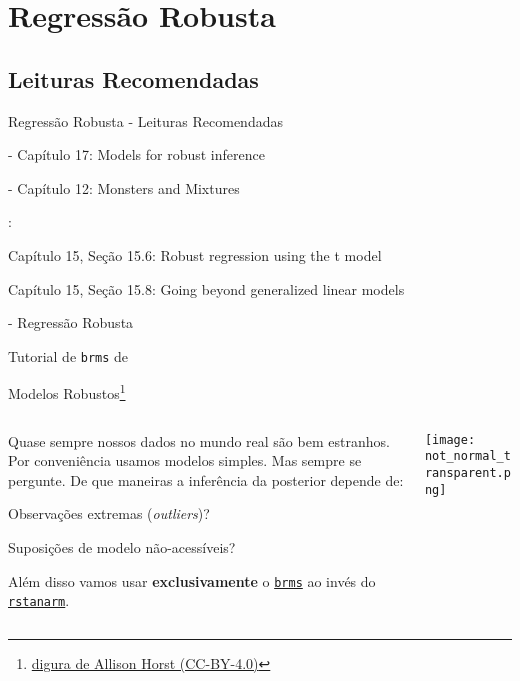 \section{Regressão Robusta}

\subsection{Leituras Recomendadas}
\begin{frame}{Regressão Robusta - Leituras Recomendadas}
    \begin{vfilleditems}
        \item \textcite{gelman2013bayesian} - Capítulo 17: Models for robust inference
        \item \textcite{mcelreath2020statistical} - Capítulo 12: Monsters and Mixtures
        \item \textcite{gelman2020regression}:
        \begin{vfilleditems}
            \item Capítulo 15, Seção 15.6: Robust regression using the t model
            \item Capítulo 15, Seção 15.8: Going beyond generalized linear models
        \end{vfilleditems}
        \item \textcite{storopoli2021estatisticabayesianaR} - Regressão Robusta
        \item Tutorial de \texttt{brms} de \textcite{burknerAdvancedBayesianMultilevel2018}
    \end{vfilleditems}
\end{frame}

\begin{frame}{Modelos Robustos\footnote{\href{https://github.com/allisonhorst/stats-illustrations}{digura de Allison Horst (CC-BY-4.0)}}}
    \begin{columns}
        \begin{column}{0.6\textwidth}
            Quase sempre nossos dados no mundo real são bem estranhos.
            \vfill
            Por conveniência usamos modelos simples. Mas sempre se
            pergunte. De que maneiras a inferência da posterior depende de:
            \vfill
            \begin{vfilleditems}
                \item Observações extremas (\textit{outliers})?
                \item Suposições de modelo não-acessíveis?
            \end{vfilleditems}
            \vfill
            Além disso vamos usar \textbf{exclusivamente} o
            \href{https://paul-buerkner.github.io/brms/}{\texttt{brms}}
            ao invés do \href{http://mc-stan.org/rstanarm/}{\texttt{rstanarm}}.
        \end{column}
        \begin{column}{0.4\textwidth}
            \texttt{[image: not\_normal\_transparent.png]}
        \end{column}
    \end{columns}
\end{frame}

